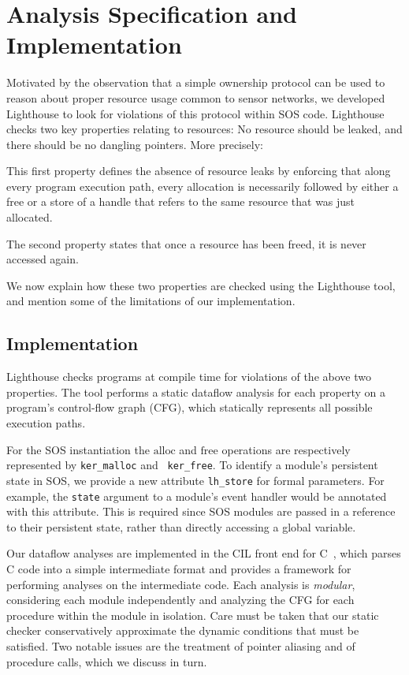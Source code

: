 \section{Analysis Specification and Implementation}
\label{sec:alg}

Motivated by the observation that a simple ownership protocol can be
used to reason about proper resource usage common to sensor networks,
we developed Lighthouse to look for violations of this protocol within
SOS code.  Lighthouse checks two key properties relating to resources:
No resource should be leaked, and there should be no dangling
pointers.  More precisely:

\smallskip{} This first property defines the
absence of resource leaks by enforcing that along every program
execution path, every allocation is necessarily followed by either a
free or a store of a handle that refers to the same resource that was
just allocated.

\smallskip{} The second property
states that once a resource has been freed, it is never accessed
again.

We now explain how these two properties are checked using the
Lighthouse tool, and mention some of the limitations of our implementation.


\subsection{Implementation}

Lighthouse checks programs at compile time for violations of the above
two properties.  The tool performs a static dataflow analysis for each
property on a program's control-flow graph (CFG), which statically
represents all possible execution paths.  

For the SOS instantiation the $\mathrm{alloc}$ and $\mathrm{free}$
operations are respectively represented by {\tt ker\_malloc} and {\tt
ker\_free}.  To identify a module's persistent state in SOS, we
provide a new attribute {\tt lh\_store} for formal parameters.  For
example, the {\tt state} argument to a module's event handler would be
annotated with this attribute.  This is required since SOS modules are
passed in a reference to their persistent state, rather than directly accessing a
global variable.

Our dataflow analyses are implemented in the CIL front end for
C~\cite{CIL}, which parses C code into a simple intermediate format
and provides a framework for performing analyses on the intermediate
code.  Each analysis is {\em modular}, considering each module
independently and analyzing the CFG for each procedure within the
module in isolation.  Care must be taken that our static checker
conservatively approximate the dynamic conditions that must be
satisfied.  Two notable issues are the treatment of pointer aliasing
and of procedure calls, which we discuss in turn.

